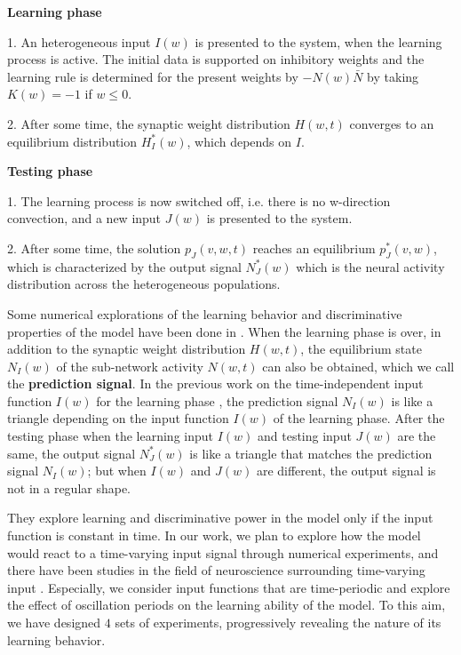 \textbf{Learning phase}
\smallskip

1. An heterogeneous input $I(w)$ is presented to the system, when the learning process is active. The initial data is supported on inhibitory weights and the learning rule is determined for the present weights by $-N(w)\bar{N}$ by taking $K(w) = -1$ if $w \leq 0$.


2. After some time, the synaptic weight distribution $H(w, t)$ converges to an equilibrium distribution $H^*_
I(w)$, which depends on $I$.\medskip



\textbf{Testing phase}
\smallskip

1. The learning process is now switched off, i.e. there is no w-direction convection, and a new input $J(w)$ is presented to the system.


2. After some time, the solution $p_J (v,w, t)$ reaches an equilibrium $p^*_J (v,w)$, which is characterized  by the output signal $N^*_J(w)$ which is the neural activity distribution across the heterogeneous populations.\medskip


Some numerical explorations of the learning behavior and discriminative properties of the model have been done in \cite{perthame2017distributed}\cite{he2022structure}. When the learning phase is over, in addition to the synaptic weight distribution $H(w, t)$, the equilibrium state $N_I(w)$ of the sub-network activity $N(w,t)$ can also be obtained, which we call the \textbf{prediction signal}. In the previous work on the time-independent input function $I(w)$ for the learning phase \cite{perthame2017distributed}\cite{he2022structure}, the prediction signal $N_I(w)$ is like a triangle depending on the input function $I(w)$ of the learning phase.  After the testing phase when the learning input $I(w)$ and testing input $J(w)$ are the same, the output signal $N_J^*(w)$ is like a triangle that matches the prediction signal $N_I(w)$; but when $I(w)$ and $J(w)$ are different, the output signal is not in a regular shape. 


They explore learning and discriminative power in the model only if the input function is constant in time. In our work, we plan to explore how the model would react to a time-varying input signal through numerical experiments, and there have been studies in the field of neuroscience surrounding time-varying input \cite{isidori1990output}. Especially, we consider input functions that are time-periodic and explore the effect of oscillation periods on the learning ability of the model. To this aim, we have designed $4$ sets of experiments, progressively revealing the nature of its learning behavior.

